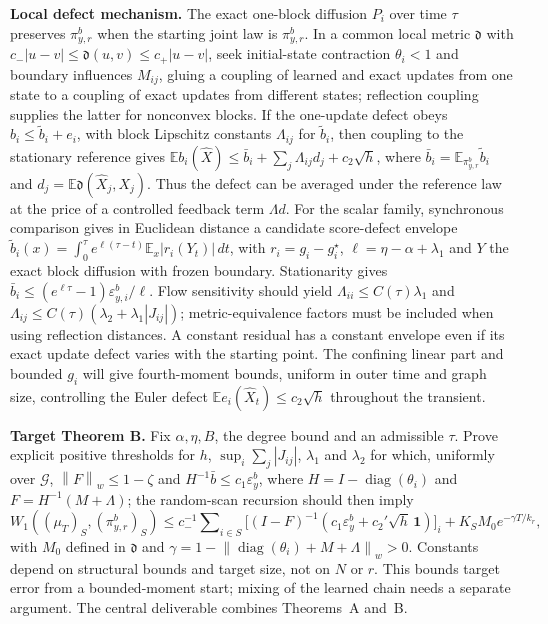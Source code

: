\documentclass[12pt,a4paper]{article}
\newcommand{\E}{\mathbb E}
\newcommand{\W}{W_1}
\newcommand{\pir}{\pi_{y,r}^{b}}
\newcommand{\epsb}{\varepsilon^{b}_{y}}
\newcommand{\normw}[1]{\left\|#1\right\|_w}
\begin{document}
\textbf{Local defect mechanism.} The exact one-block diffusion $P_i$ over time $\tau$ preserves $\pir$ when the starting joint law is $\pir$. In a common local metric $\mathfrak d$ with $c_-|u-v|\leq\mathfrak d(u,v)\leq c_+|u-v|$, seek initial-state contraction $\theta_i<1$ and boundary influences $M_{ij}$, gluing a coupling of learned and exact updates from one state to a coupling of exact updates from different states; reflection coupling supplies the latter for nonconvex blocks. If the one-update defect obeys $b_i\leq\widetilde b_i+e_i$, with block Lipschitz constants $\Lambda_{ij}$ for $\widetilde b_i$, then coupling to the stationary reference gives $\E b_i(\widehat X)\leq\bar b_i+\sum_j\Lambda_{ij}d_j+c_2\sqrt h$, where $\bar b_i=\E_{\pir}\widetilde b_i$ and $d_j=\E\mathfrak d(\widehat X_j,X_j)$. Thus the defect can be averaged under the reference law at the price of a controlled feedback term $\Lambda d$.
For the scalar family, synchronous comparison gives in Euclidean distance a candidate score-defect envelope $\widetilde b_i(x)=\int_0^\tau e^{\ell(\tau-t)}\E_x|r_i(Y_t)|\,dt$, with $r_i=g_i-g_i^\star$, $\ell=\eta-\alpha+\lambda_1$ and $Y$ the exact block diffusion with frozen boundary. Stationarity gives $\bar b_i\leq (e^{\ell\tau}-1)\varepsilon^b_{y,i}/\ell$. Flow sensitivity should yield $\Lambda_{ii}\leq C(\tau)\lambda_1$ and $\Lambda_{ij}\leq C(\tau)(\lambda_2+\lambda_1|J_{ij}|)$; metric-equivalence factors must be included when using reflection distances. A constant residual has a constant envelope even if its exact update defect varies with the starting point. The confining linear part and bounded $g_i$ will give fourth-moment bounds, uniform in outer time and graph size, controlling the Euler defect $\E e_i(\widehat X_t)\leq c_2\sqrt h$ throughout the transient.

\textbf{Target Theorem B.} Fix $\alpha,\eta,B$, the degree bound and an admissible $\tau$. Prove explicit positive thresholds for $h$, $\sup_i\sum_j|J_{ij}|$, $\lambda_1$ and $\lambda_2$ for which, uniformly over $\mathcal G$, $\normw{F}\leq1-\zeta$ and $H^{-1}\bar b\leq c_1\epsb$, where $H=I-\operatorname{diag}(\theta_i)$ and $F=H^{-1}(M+\Lambda)$; the random-scan recursion should then imply
\begin{equation}\label{eq:main}
 \W((\mu_T)_S,(\pir)_S)
 \leq c_-^{-1}\sum\nolimits_{i\in S}\bigl[(I-F)^{-1}
 (c_1\epsb+c_2'\sqrt h\,\mathbf1)\bigr]_i
 +K_SM_0 e^{-\gamma T/k_r},
\end{equation}
with $M_0$ defined in $\mathfrak d$ and $\gamma=1-\normw{\operatorname{diag}(\theta_i)+M+\Lambda}>0$. Constants depend on structural bounds and target size, not on $N$ or $r$. This bounds target error from a bounded-moment start; mixing of the learned chain needs a separate argument. The central deliverable combines Theorems~A and~B.
\end{document}

